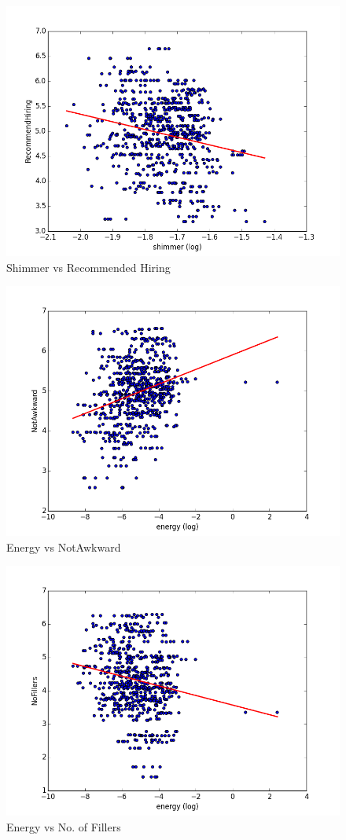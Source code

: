 \documentclass[11pt]{article}
\begin{document}
\begin{figure}[h!]
\begin{center}
\includegraphics[width=0.65\columnwidth]{figures/RecommendHiring and shimmer.png}
\caption{Shimmer vs Recommended Hiring}
\label{fig:prosodic_analysis2}
\end{center}
\end{figure}

\begin{figure}[h!]
\begin{center}
\includegraphics[width=0.65\columnwidth]{figures/NotAwkward and energy.png}
\caption{Energy vs NotAwkward}
\label{fig:prosodic_analysis3}
\end{center}
\end{figure}

\begin{figure}[h!]
\begin{center}
\includegraphics[width=0.65\columnwidth]{figures/NoFillers and energy.png}
\caption{Energy vs No. of Fillers}
\label{fig:prosodic_analysis3}
\end{center}
\end{figure}
\end{document}
